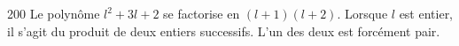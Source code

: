 
\begin{corrige}{200}
Le polynôme $l^2+3l+2$ se factorise en $(l+1)(l+2)$. Lorsque $l$ est entier, il s'agit du produit de deux entiers successifs. L'un des deux est forcément pair.
\end{corrige}
